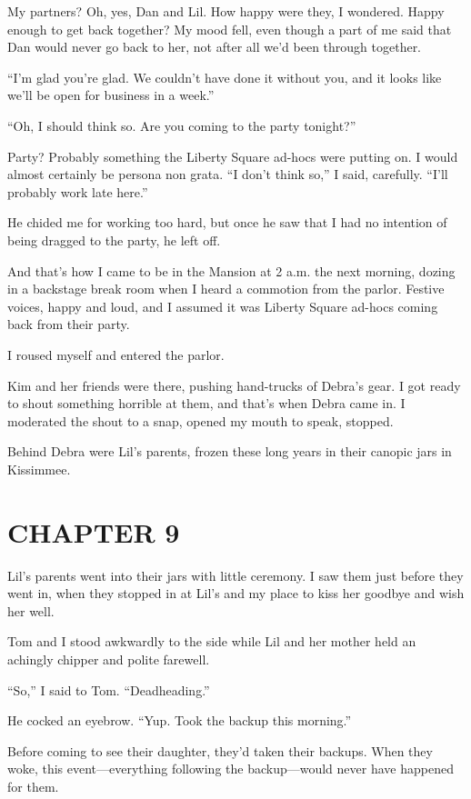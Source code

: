 My partners? Oh, yes, Dan and Lil. How happy were they, I wondered.
Happy enough to get back together? My mood fell, even though a part
of me said that Dan would never go back to her, not after all we'd
been through together.

“I'm glad you're glad. We couldn't have done it without you, and it
looks like we'll be open for business in a week.”

“Oh, I should think so. Are you coming to the party tonight?”

Party? Probably something the Liberty Square ad-hocs were putting
on. I would almost certainly be persona non grata. “I don't think
so,” I said, carefully. “I'll probably work late here.”

He chided me for working too hard, but once he saw that I had no
intention of being dragged to the party, he left off.

And that's how I came to be in the Mansion at 2 a.m. the next
morning, dozing in a backstage break room when I heard a commotion
from the parlor. Festive voices, happy and loud, and I assumed it
was Liberty Square ad-hocs coming back from their party.

I roused myself and entered the parlor.

Kim and her friends were there, pushing hand-trucks of Debra's
gear. I got ready to shout something horrible at them, and that's
when Debra came in. I moderated the shout to a snap, opened my
mouth to speak, stopped.

Behind Debra were Lil's parents, frozen these long years in their
canopic jars in Kissimmee.

\section{CHAPTER 9}

Lil's parents went into their jars with little ceremony. I saw them
just before they went in, when they stopped in at Lil's and my
place to kiss her goodbye and wish her well.

Tom and I stood awkwardly to the side while Lil and her mother held
an achingly chipper and polite farewell.

“So,” I said to Tom. “Deadheading.”

He cocked an eyebrow. “Yup. Took the backup this morning.”

Before coming to see their daughter, they'd taken their backups.
When they woke, this event—everything following the backup—would
never have happened for them.

